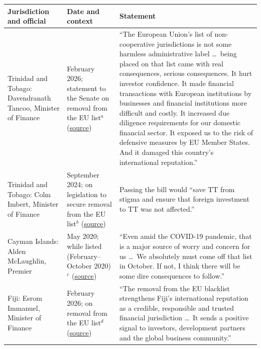 \begin{footnotesize}
\renewcommand{\arraystretch}{1.35}
\begin{tabularx}{\textwidth}{@{}>{\raggedright\arraybackslash}p{} >{\raggedright\arraybackslash}p{} >{\raggedright\arraybackslash}X@{}}
\toprule
\textbf{Jurisdiction and official} & \textbf{Date and context} & \textbf{Statement} \\
\midrule
Trinidad and Tobago: Davendranath Tancoo, Minister of Finance
& 24 February 2026; statement to the Senate on removal from the EU list$^{a}$ (\href{https://www.finance.gov.tt/wp-content/uploads/2026/02/MINISTERS-STATEMENT-ON-THE-REMOVAL-OF-TRINIDAD-AND-TOBAGO-FROM-THE-EUROPEAN-UNION-LIST-OF-NON-COOPERATIVE-JURISDICTIONS-FOR-TAX-PURPOSES.pdf}{source})
& ``The European Union's list of non-cooperative jurisdictions is not some harmless administrative label \ldots\ being placed on that list came with real consequences, serious consequences. It hurt investor confidence. It made financial transactions with European institutions by businesses and financial institutions more difficult and costly. It increased due diligence requirements for our domestic financial sector. It exposed us to the risk of defensive measures by EU Member States. And it damaged this country's international reputation.'' \\
\addlinespace
Trinidad and Tobago: Colm Imbert, Minister of Finance
& September 2024; on legislation to secure removal from the EU list$^{b}$ (\href{https://newsday.co.tt/2024/09/14/imbert-bill-will-get-trinidad-and-tobago-off-of-eus-blacklist/}{source})
& Passing the bill would ``save TT from stigma and ensure that foreign investment to TT was not affected.'' \\
\addlinespace
Cayman Islands: Alden McLaughlin, Premier
& May 2020; while listed (February--October 2020)$^{c}$ (\href{https://caymannewsservice.com/2020/05/eu-blacklist-a-major-worry/}{source})
& ``Even amid the COVID-19 pandemic, that is a major source of worry and concern for us \ldots\ We absolutely must come off that list in October. If not, I think there will be some dire consequences to follow.'' \\
\addlinespace
Fiji: Esrom Immanuel, Minister of Finance
& February 2026; on removal from the EU list$^{d}$ (\href{https://pmn.co.nz/read/pacific-region/samoa-and-fiji-removed-from-eu-tax-blacklist}{source})
& ``The removal from the EU blacklist strengthens Fiji's international reputation as a credible, responsible and trusted financial jurisdiction \ldots\ It sends a positive signal to investors, development partners and the global business community.'' \\
\bottomrule
\end{tabularx}
\end{footnotesize}
